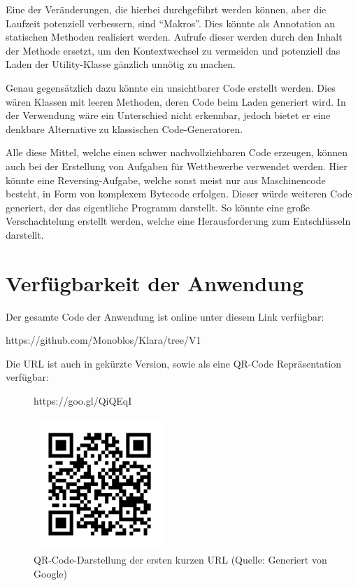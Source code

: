 Eine der Veränderungen, die hierbei durchgeführt werden können, aber die Laufzeit potenziell verbessern, sind "`Makros"'. Dies könnte als Annotation an statischen Methoden realisiert werden. Aufrufe dieser werden durch den Inhalt der Methode ersetzt, um den Kontextwechsel zu vermeiden und potenziell das Laden der Utility-Klasse gänzlich unnötig zu machen.

Genau gegensätzlich dazu könnte ein unsichtbarer Code erstellt werden. Dies wären Klassen mit leeren Methoden, deren Code beim Laden generiert wird. In der Verwendung wäre ein Unterschied nicht erkennbar, jedoch bietet er eine denkbare Alternative zu klassischen Code-Generatoren.

Alle diese Mittel, welche einen schwer nachvollziehbaren Code erzeugen, können auch bei der Erstellung von Aufgaben für Wettbewerbe verwendet werden. Hier könnte eine Reversing-Aufgabe, welche sonst meist nur aus Maschinencode besteht, in Form von komplexem Bytecode erfolgen. Dieser würde weiteren Code generiert, der das eigentliche Programm darstellt. So könnte eine große Verschachtelung erstellt werden, welche eine Herausforderung zum Entschlüsseln darstellt.

\chapter{Verfügbarkeit der Anwendung}

Der gesamte Code der Anwendung ist online unter diesem Link verfügbar:

https://github.com/Monoblos/Klara/tree/V1

Die URL ist auch in gekürzte Version, sowie als eine QR-Code Repräsentation verfügbar:

\begin{figure}[h]
	\centering
	https://goo.gl/QiQEqI
	
	\includegraphics[width=5cm]{fazit/klara_short.png}
	\caption{QR-Code-Darstellung der ersten kurzen URL (Quelle: Generiert von Google)}
\end{figure}

